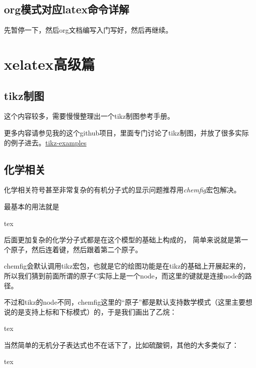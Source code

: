\documentclass[11pt,oneside]{book}
\begin{document}
\chapter{org模式对应latex命令详解}
先暂停一下，然后org文档编写入门写好，然后再继续。









\part{xelatex高级篇}
\chapter{tikz制图}
这个内容较多，需要慢慢整理出一个tikz制图参考手册。

更多内容请参见我的这个github项目，里面专门讨论了tikz制图，并放了很多实际的例子进去。\href{https://github.com/a358003542/tikz-examples}{tikz-examples}








\chapter{化学相关}
化学相关符号甚至非常复杂的有机分子式的显示问题推荐用\emph{chemfig}宏包解决。

最基本的用法就是
\begin{tcbcode}{tex}
\end{tcbcode}


后面更加复杂的化学分子式都是在这个模型的基础上构成的， 简单来说就是第一个原子，然后连着键，然后跟着第二个原子。

chemfig会默认调用tikz宏包，也就是它的绘图功能是在tikz的基础上开展起来的，所以我们猜到前面所谓的原子C实际上是一个node，而这里的键就是连接node的路径。

不过和tikz的node不同，chemfig这里的“原子”都是默认支持数学模式（这里主要想说的是支持上标和下标模式）的，于是我们画出了乙烷：
\begin{tcbcode}{tex}
\end{tcbcode}


当然简单的无机分子表达式也不在话下了，比如硫酸铜，其他的大多类似了：
\begin{tcbcode}{tex}
\end{tcbcode}
\end{document}
